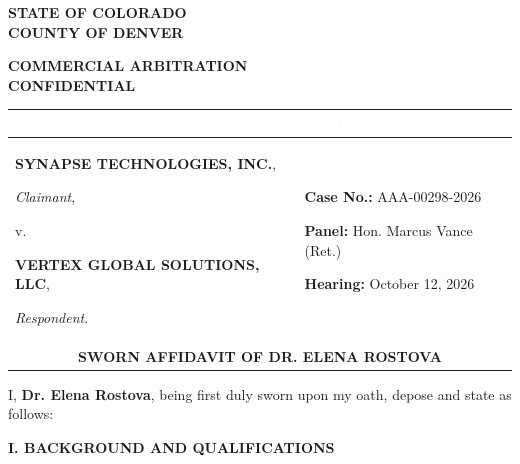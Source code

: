 \documentclass[12pt,letterpaper]{article}
\begin{document}
\noindent
\begin{minipage}[t]{0.5\textwidth}
  \textbf{STATE OF COLORADO} \\
  \textbf{COUNTY OF DENVER}
\end{minipage}
\hfill
\begin{minipage}[t]{0.4\textwidth}
  \begin{flushright}
    \textbf{COMMERCIAL ARBITRATION} \\
    \textbf{CONFIDENTIAL}
  \end{flushright}
\end{minipage}
\par\vspace{1.0em}

\noindent
\renewcommand{\arraystretch}{1.4}
\begin{tabularx}{\textwidth}{|X|p{2.6in}|}
\hline
\multicolumn{2}{|c|}{\cellcolor{LegalNavy}\textcolor{white}{\textbf{\MakeUppercase{Before the American Arbitration Association}}}} \\
\hline
\textbf{SYNAPSE TECHNOLOGIES, INC.}, \par
\textit{Claimant}, \par
v. \par
\textbf{VERTEX GLOBAL SOLUTIONS, LLC}, \par
\textit{Respondent}. &
\textbf{Case No.:} AAA-00298-2026 \par
\textbf{Panel:} Hon. Marcus Vance (Ret.) \par
\textbf{Hearing:} October 12, 2026 \\
\hline
\multicolumn{2}{|c|}{\cellcolor{LegalLight}\textbf{\textcolor{LegalNavy}{\MakeUppercase{Sworn Affidavit of Dr. Elena Rostova}}}} \\
\hline
\end{tabularx}
\renewcommand{\arraystretch}{1.0}
\par\vspace{1.8em}

\noindent
I, \textbf{Dr. Elena Rostova}, being first duly sworn upon my oath, depose and state as follows:

\par\vspace{1.0em}

\begin{center}
  \textbf{\textcolor{LegalNavy}{\MakeUppercase{I. Background and Qualifications}}}
\end{center}
\par\vspace{0.3em}
\end{document}
